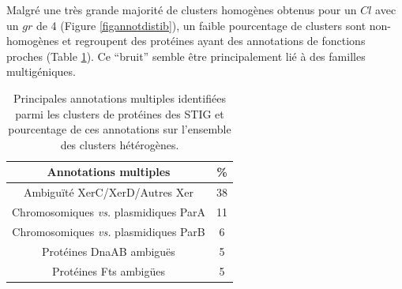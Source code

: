 Malgré une très grande majorité de clusters homogènes obtenus pour un $Cl$ avec un $gr$ de 4 (Figure \ref{figannotdistib}), un faible pourcentage de clusters sont non-homogènes et regroupent des protéines ayant des annotations de fonctions proches (Table \ref{tabcausehetero}). Ce “bruit” semble être principalement lié à des familles multigéniques.
 \\

\begin{table}[H]
	\begin{center}
	\caption[Principales annotations multiples identifiées parmi les clusters]{Principales annotations multiples  identifiées parmi les clusters de protéines des STIG et pourcentage de ces annotations sur l'ensemble des clusters hétérogènes.}\label{tabcausehetero}
	\begin{tabular}{cc}
	\textbf{Annotations multiples} & \% \\
	\hline
	Ambiguïté XerC/XerD/Autres Xer & 38 \\
	Chromosomiques \textit{vs.} plasmidiques ParA & 11 \\
     Chromosomiques \textit{vs.} plasmidiques ParB & 6 \\
	Protéines DnaAB ambiguës & 5 \\
	Protéines Fts ambigües & 5 \\
     \end{tabular}
 \\ 
    
     \end{center}
\end{table}
     
